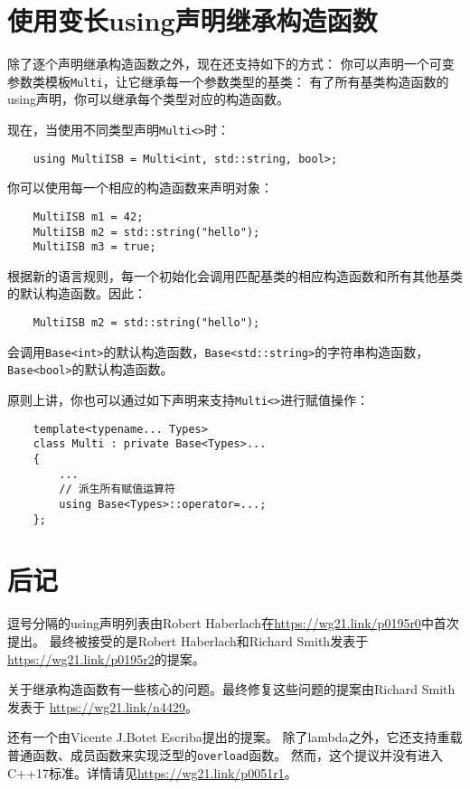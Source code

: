 \section{使用变长using声明继承构造函数}
除了逐个声明继承构造函数之外，现在还支持如下的方式：
你可以声明一个可变参数类模板\texttt{Multi}，让它继承每一个参数类型的基类：
有了所有基类构造函数的using声明，你可以继承每个类型对应的构造函数。

现在，当使用不同类型声明\texttt{Multi<>}时：
\begin{lstlisting}
    using MultiISB = Multi<int, std::string, bool>;
\end{lstlisting}
你可以使用每一个相应的构造函数来声明对象：
\begin{lstlisting}
    MultiISB m1 = 42;
    MultiISB m2 = std::string("hello");
    MultiISB m3 = true;
\end{lstlisting}
根据新的语言规则，每一个初始化会调用匹配基类的相应构造函数和所有其他基类的默认构造函数。因此：
\begin{lstlisting}
    MultiISB m2 = std::string("hello");
\end{lstlisting}
会调用\texttt{Base<int>}的默认构造函数，\texttt{Base<std::string>}的字符串构造函数，
\texttt{Base<bool>}的默认构造函数。

原则上讲，你也可以通过如下声明来支持\texttt{Multi<>}进行赋值操作：
\begin{lstlisting}
    template<typename... Types>
    class Multi : private Base<Types>...
    {
        ...
        // 派生所有赋值运算符
        using Base<Types>::operator=...;
    };
\end{lstlisting}

\section{后记}
逗号分隔的using声明列表由Robert Haberlach在\url{https://wg21.link/p0195r0}中首次提出。
最终被接受的是Robert Haberlach和Richard Smith发表于\url{https://wg21.link/p0195r2}的提案。

关于继承构造函数有一些核心的问题。最终修复这些问题的提案由Richard Smith发表于
\url{https://wg21.link/n4429}。

还有一个由Vicente J.Botet Escriba提出的提案。
除了lambda之外，它还支持重载普通函数、成员函数来实现泛型的\texttt{overload}函数。
然而，这个提议并没有进入C++17标准。详情请见\url{https://wg21.link/p0051r1}。
